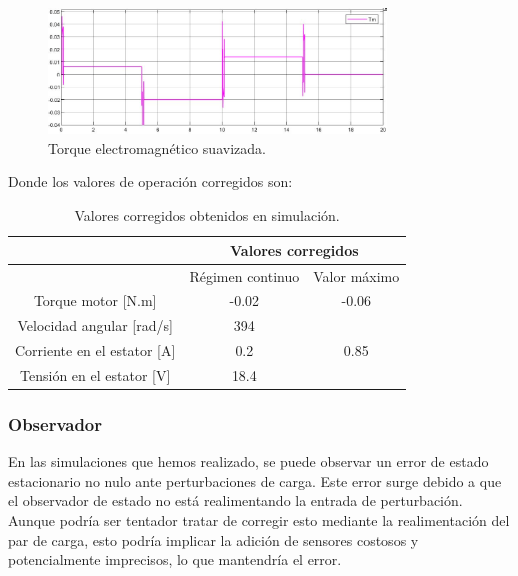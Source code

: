 \documentclass{article}
\begin{document}
\begin{figure}[H]
    \centering
    \includegraphics[width=0.8\textwidth]{5.2..5.1.a.5.png}
    \caption{Torque electromagnético suavizada.}
\end{figure}

Donde los valores de operación corregidos son:

\begin{table}[H]
    \begin{center}
    \begin{tabular}{|c|c|c|}
        \hline
         & \multicolumn{2}{c|}{Valores corregidos} \\
        \hline
          & Régimen continuo & Valor máximo \\
        \hline
        Torque motor [N.m]  & -0.02 & -0.06 \\
        \hline
        Velocidad angular [rad/s] & 394 &  \\
        \hline
        Corriente en el estator [A] & 0.2 & 0.85 \\
        \hline
        Tensión en el estator [V]  & 18.4 &\\
        \hline
    \end{tabular}
\end{center}
\caption{Valores corregidos obtenidos en simulación.}
\end{table}


\subsubsection{Observador}

En las simulaciones que hemos realizado, se puede observar un error de estado estacionario no nulo 
ante perturbaciones de carga. Este error surge debido a que el observador de estado no está 
realimentando la entrada de perturbación. Aunque podría ser tentador tratar de corregir esto 
mediante la realimentación del par de carga, esto podría implicar la adición de sensores costosos 
y potencialmente imprecisos, lo que mantendría el error.
\end{document}
